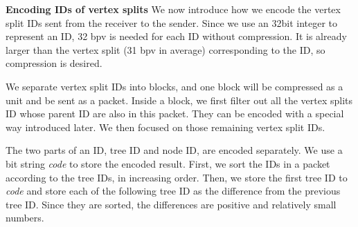     \textbf{Encoding IDs of vertex splits}
    We now introduce how we encode the vertex split IDs sent from the receiver to the
    sender. Since we use an 32bit integer to represent an ID, 32 bpv is needed for each ID
    without compression. It is already larger than the vertex split (31 bpv in average)
    corresponding to the ID, so compression is desired.
    
    We separate vertex split IDs into blocks, and one block will be compressed as a unit and
    be sent as a packet. Inside a block, we first filter out all the vertex splits ID
    whose parent ID are also in this packet. They can be encoded with a special way introduced
    later. We then focused on those remaining vertex split IDs.
    
    The two parts of an ID, tree ID and node ID, are encoded separately.  
    We use a bit string \textit{code} to store the encoded result.
    First, we sort the IDs in a packet according to the tree IDs, in increasing order. 
    Then, we store the first tree ID to \textit{code} and 
    store each of the following tree ID as the difference from the previous tree ID.
    Since they are sorted, the differences are positive and relatively small numbers.

